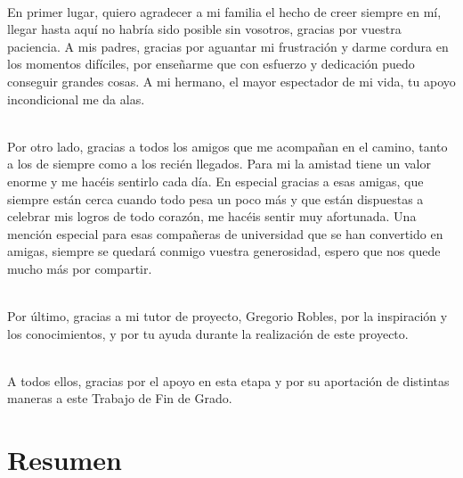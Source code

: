 \documentclass[a4paper, 12pt]{book}
\begin{document}
\\En primer lugar, quiero agradecer a mi familia el hecho de creer siempre en mí, llegar hasta aquí no habría sido posible sin vosotros,
gracias por vuestra paciencia. A mis padres, gracias por aguantar mi frustración y darme cordura en los momentos difíciles, por enseñarme
que con esfuerzo y dedicación puedo conseguir grandes cosas. A mi hermano, el mayor espectador de mi vida, tu apoyo incondicional me da alas.

\\Por otro lado, gracias a todos los amigos que me acompañan en el camino, tanto a los de siempre como a los recién llegados. Para mi la
amistad tiene un valor enorme y me hacéis sentirlo cada día. En especial gracias a esas amigas, que siempre están cerca cuando todo pesa un poco
más y que están dispuestas a celebrar mis logros de todo corazón, me hacéis sentir muy afortunada. Una mención especial para esas compañeras de universidad que se han convertido en amigas, siempre se quedará conmigo vuestra generosidad,
espero que nos quede mucho más por compartir.

\\Por último, gracias a mi tutor de proyecto, Gregorio Robles, por la inspiración y los conocimientos, y por tu ayuda durante la realización de este proyecto.

\\A todos ellos, gracias por el apoyo en esta etapa y por su aportación de distintas maneras a este Trabajo de Fin de Grado.


\chapter*{Resumen}
\end{document}
